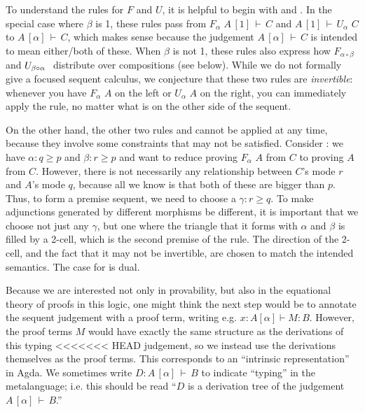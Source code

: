 \documentclass{drl-common/llncs}
\newcommand\compo[2]{\ensuremath{#1 \circ #2}}
\newcommand\F[2]{\ensuremath{F_{#1} \,\, #2}}
\newcommand\U[2]{\ensuremath{U_{#1} \,\, #2}}
\newcommand\seq[3]{\ensuremath{#1 \, [ #2 ] \, \vdash \, #3}}
\renewcommand\irl[1]{\dsd{#1}}
\begin{document}
To understand the rules for $F$ and $U$, it is helpful to begin with
\irl{FL} and \irl{UR}.  In the special case where $\beta$ is 1, these
rules pass from \seq{\F {\alpha}{A}}{1}{C} and \seq{A}{1}{\U{\alpha}{C}}
to \seq{A}{\alpha}{C}, which makes sense because the judgement
\seq{A}{\alpha}{C} is intended to mean either/both of these.  When
$\beta$ is not 1, these rules also express how
$\F{\compo{\alpha}{\beta}}{}$ and $\U{\compo{\beta}{\alpha}}$ distribute
over compositions (see below).  While we do not formally give a focused
sequent calculus, we conjecture that these two rules are
\emph{invertible}: whenever you have \F{\alpha}{A} on the left or
\U{\alpha}{A} on the right, you can immediately apply the rule, no
matter what is on the other side of the sequent.

On the other hand, the other two rules \irl{UL} and \irl{FR} cannot be
applied at any time, because they involve some constraints that may not
be satisfied.  Consider \irl{FR}: we have $\alpha : q \ge p$ and $\beta
: r \ge p$ and want to reduce proving \F{\alpha}{A} from $C$ to proving
$A$ from $C$.  However, there is not necessarily any relationship
between $C$'s mode $r$ and $A$'s mode $q$, because all we know is that
both of these are bigger than $p$.  Thus, to form a premise sequent, we
need to choose a $\gamma : r \ge q$.  To make adjunctions generated by
different morphisms be different, it is important that we choose not
just any $\gamma$, but one where the triangle that it forms with
$\alpha$ and $\beta$ is filled by a 2-cell, which is the second premise
of the rule.  The direction of the 2-cell, and the fact that it may not
be invertible, are chosen to match the intended semantics.  The case for
\irl{UR} is dual.

Because we are interested not only in provability, but also in the
equational theory of proofs in this logic, one might think the next step
would be to annotate the sequent judgement with a proof term, writing
e.g. $x : A [ \alpha ] \vdash M : B$.  However, the proof terms $M$
would have exactly the same structure as the derivations of this typing
<<<<<<< HEAD
judgement, so we instead use the derivations themselves as the proof
terms.  This corresponds to an ``intrinsic representation'' in Agda.  We
sometimes write $D : \seq{A}{\alpha}{B}$ to indicate ``typing'' in the
metalanguage; i.e. this should be read ``$D$ is a derivation tree of the
judgement \seq{A}{\alpha}{B}.''
\end{document}
